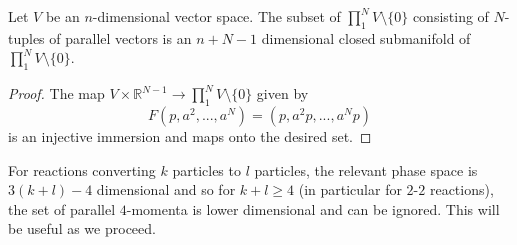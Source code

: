 \begin{lemma}\label{parallel:lemma}
Let $V$ be an $n$-dimensional vector space.  The subset of $\prod_1^N V\setminus\{0\}$ consisting of $N$-tuples of parallel vectors is an $n+N-1$ dimensional closed submanifold of $\prod_1^N V\setminus\{0\}$.
\end{lemma}
\begin{proof}
The map $V\times \mathbb{R}^{N-1}\rightarrow  \prod_1^N V\setminus\{0\}$ given by
\begin{equation}
F(p,a^2,...,a^N)=(p,a^2p,...,a^{N}p)
\end{equation}
is an injective immersion and maps onto the desired set.
\end{proof}
For reactions converting $k$ particles to $l$ particles, the relevant phase space is $3(k+l)-4$ dimensional and so for $k+l\geq 4$ (in particular for $2$-$2$ reactions), the set of parallel $4$-momenta is lower dimensional and can be ignored. This will be useful as we proceed.

